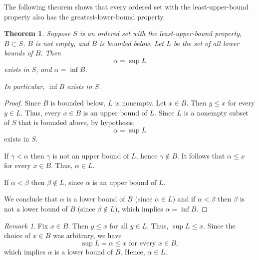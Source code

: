 \documentclass[11pt]{article}
\theoremstyle{definition}
\theoremstyle{plain}
\newtheorem{theorem}[definition]{Theorem}
\theoremstyle{remark}
\newtheorem{remark}[definition]{Remark}
\begin{document}
The following theorem shows that every ordered set with the least-upper-bound property also has the greatest-lower-bound property.
\begin{theorem}
Suppose $S$ is an ordered set with the least-upper-bound property, $B \subset S$, $B$ is not empty, and $B$ is bounded below. Let $L$ be the set of all lower bounds of $B$. Then \[\alpha = \sup L\] exists in $S$, and $\alpha = \inf B$.

In particular, $\inf B$ exists in $S$.
\end{theorem}
\begin{proof}
Since $B$ is bounded below, $L$ is nonempty. 
Let $x \in B$. Then $y \leq x$ for every $y \in L$. 
Thus, every $x \in B$ is an upper bound of $L$. 
Since $L$ is a nonempty subset of $S$ that is bounded above, by hypothesis, \[\alpha = \sup L\] exists in $S$.

If $\gamma < \alpha$ then $\gamma$ is not an upper bound of $L$, hence $\gamma \notin B$. It follows that $\alpha \leq x$ for every $x \in B$. Thus, $\alpha \in L$.

If $\alpha < \beta$ then $\beta \notin L$, since $\alpha$ is an upper bound of $L$.

We conclude that $\alpha$ is a lower bound of $B$ (since $\alpha \in L$) and if $\alpha < \beta$ then $\beta$ is not a lower bound of $B$ (since $\beta \notin L$), which implies $\alpha = \inf B$.
\end{proof}
\begin{remark}
Fix $x \in B$. Then $y \leq x$ for all $y \in L$. Thus, $\sup L \leq x$. Since the choice of $x \in B$ was arbitrary, we have 
\[
\sup L = \alpha \leq x \text{ for every } x \in B,
\]
which implies $\alpha$ is a lower bound of $B$. Hence, $\alpha \in L$.
\end{remark}
\end{document}
